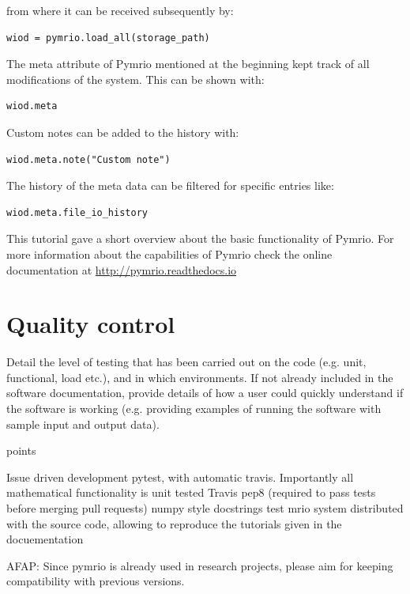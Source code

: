 \documentclass{jors}
\begin{document}
{from where it can be received subsequently by:

\begin{lstlisting}
wiod = pymrio.load_all(storage_path)
\end{lstlisting}

The meta attribute of Pymrio mentioned at the beginning kept track of all modifications of the system.
This can be shown with:

\begin{lstlisting}
wiod.meta
\end{lstlisting}

Custom notes can be added to the history with:
\begin{lstlisting}
wiod.meta.note("Custom note")
\end{lstlisting}


The history of the meta data can be filtered for specific entries like:

\begin{lstlisting}
wiod.meta.file_io_history
\end{lstlisting}


This tutorial gave a short overview about the basic functionality of Pymrio. 
For more information about the capabilities of Pymrio check the online documentation at 
\url{http://pymrio.readthedocs.io} 
\cite{stadler2018}



\section*{Quality control}


Detail the level of testing that has been carried out on the code (e.g. unit, functional, load etc.), and in which environments. If not already included in the software documentation, provide details of how a user could quickly understand if the software is working (e.g. providing examples of running the software with sample input and output data). }

points

Issue driven development
pytest, with automatic travis. Importantly all mathematical functionality is unit tested
Travis 
pep8 (required to pass tests before merging pull requests)
numpy style docstrings
test mrio system distributed with the source code, allowing to reproduce the tutorials given in the docuementation

AFAP: Since pymrio is already used in research projects, please aim for keeping compatibility with previous versions.
\end{document}
